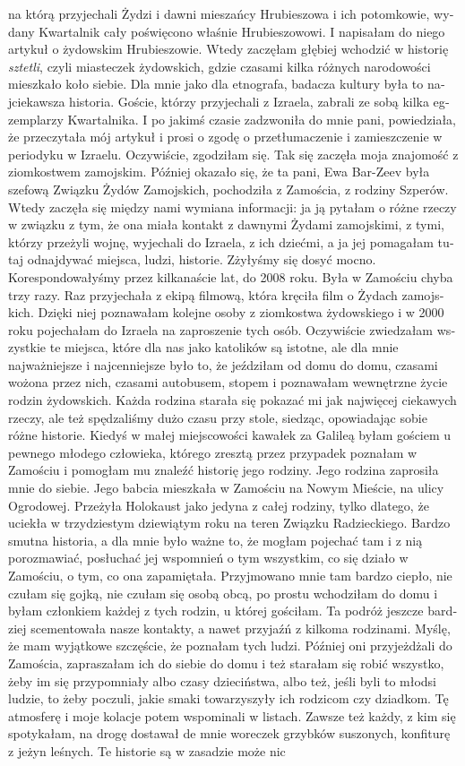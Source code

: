 \begin{otherlanguage}{ngerman}
na którą przyjechali Żydzi i dawni mieszańcy Hrubieszowa i ich potomkowie, wydany Kwartalnik cały poświęcono właśnie Hrubieszowowi. I napisałam do niego artykuł o żydowskim Hrubieszowie. Wtedy zaczęłam głębiej wchodzić w historię \textit{sztetli}, czyli miasteczek żydowskich, gdzie czasami kilka różnych narodowości mieszkało koło siebie. Dla mnie jako dla etnografa, badacza kultury była to najciekawsza historia. Goście, którzy przyjechali z Izraela, zabrali ze sobą kilka egzemplarzy Kwartalnika. I po jakimś czasie zadzwoniła do mnie pani, powiedziała, że przeczytała mój artykuł i prosi o zgodę o przetłumaczenie i zamieszczenie w periodyku w Izraelu. Oczywiście, zgodziłam się. Tak się zaczęła moja znajomość z ziomkostwem zamojskim. Później okazało się, że ta pani, Ewa Bar-Zeev była szefową Związku Żydów Zamojskich, pochodziła z Zamościa, z rodziny Szperów. Wtedy zaczęła się między nami  wymiana informacji: ja ją pytałam o różne rzeczy w związku z tym, że ona miała kontakt z dawnymi Żydami zamojskimi, z tymi, którzy przeżyli wojnę, wyjechali do Izraela, z ich dziećmi, a ja jej pomagałam tutaj odnajdywać miejsca, ludzi, historie. Zżyłyśmy się dosyć mocno. Korespondowałyśmy przez kilkanaście lat, do 2008 roku. Była w Zamościu chyba trzy razy. Raz przyjechała z ekipą filmową, która kręciła film o Żydach zamojskich. Dzięki niej poznawałam kolejne osoby z ziomkostwa żydowskiego i w 2000 roku pojechałam do Izraela na zaproszenie tych osób. Oczywiście zwiedzałam wszystkie te miejsca, które dla nas jako katolików są istotne, ale dla mnie najważniejsze i najcenniejsze było to, że jeździłam od domu do domu, czasami wożona przez nich, czasami autobusem, stopem i poznawałam wewnętrzne życie rodzin żydowskich. Każda rodzina starała się pokazać mi jak najwięcej ciekawych rzeczy, ale też spędzaliśmy dużo czasu przy stole, siedząc, opowiadając sobie różne historie. Kiedyś w małej miejscowości kawałek za Galileą byłam gościem u pewnego młodego człowieka, którego zresztą przez przypadek poznałam w Zamościu i pomogłam mu znaleźć historię jego rodziny. Jego rodzina zaprosiła mnie do siebie. Jego babcia mieszkała w Zamościu na Nowym Mieście, na ulicy Ogrodowej. Przeżyła Holokaust jako jedyna z całej rodziny, tylko dlatego, że uciekła w trzydziestym dziewiątym roku na teren Związku Radzieckiego. Bardzo smutna historia, a dla mnie było ważne to, że mogłam pojechać tam i z nią porozmawiać, posłuchać jej wspomnień o tym wszystkim, co się działo w Zamościu, o tym, co ona zapamiętała. Przyjmowano mnie tam bardzo ciepło, nie czułam się gojką, nie czułam się osobą obcą, po prostu wchodziłam do domu i byłam członkiem każdej z tych rodzin, u której gościłam. Ta podróż jeszcze bardziej scementowała nasze kontakty, a nawet przyjaźń z kilkoma rodzinami. Myślę, że mam wyjątkowe szczęście, że poznałam tych ludzi.  Później oni przyjeżdżali do Zamościa, zapraszałam ich do siebie do domu i też starałam się robić wszystko, żeby im się przypomniały albo czasy dzieciństwa, albo też, jeśli byli to młodsi ludzie, to żeby poczuli, jakie smaki towarzyszyły ich rodzicom czy dziadkom. Tę atmosferę i moje kolacje potem wspominali w listach. Zawsze też każdy, z kim się spotykałam, na drogę dostawał de mnie woreczek grzybków suszonych, konfiturę z jeżyn leśnych. Te historie są w zasadzie może nic 
\end{otherlanguage}
